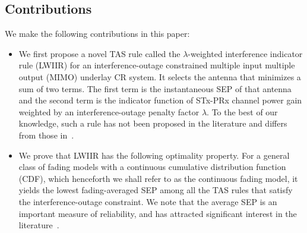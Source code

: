 \documentclass[12pt,draftcls,peerreview,onecolumn]{IEEEtran}
\newcommand{\lam}{\lambda}
\begin{document}
\subsection{Contributions} 
We make the following contributions in this paper:
\begin{itemize}
\item We first propose a novel TAS rule called the $\lam$-weighted interference indicator rule (LWIIR) for an interference-outage constrained multiple input multiple output (MIMO) underlay CR system. It selects the antenna that minimizes a sum of two terms. The first term is the instantaneous SEP of that antenna and the second term is the indicator function of STx-PRx channel power gain weighted by an interference-outage penalty factor $\lam$. To the best of our knowledge, such a rule has not been proposed in the literature and differs from those in~\cite{Wang_2011_TCom,Dmochowski_2011_CROWNCOM,Wang_2010_TWC}.

\item We prove that LWIIR has the following optimality property.  For a general class of fading models with a continuous cumulative distribution function (CDF), which henceforth we shall refer to as the continuous fading model, it yields the lowest fading-averaged SEP among all the TAS rules that satisfy the interference-outage constraint. We note that the average SEP is an important measure of reliability, and has attracted significant interest in the literature~\cite{Kashyap_2014_TCOM,Sarvendranath_2013_TCOM,Sarvendranath_2014_TCOM,li_2011_pimrc}. 


\end{itemize}
\end{document}

